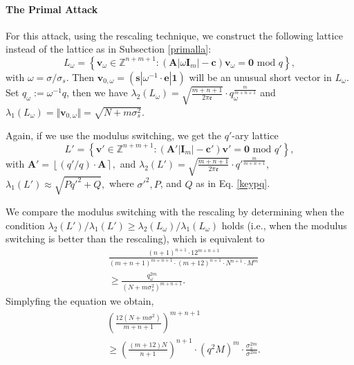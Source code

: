 \documentclass{cta-author}
\begin{document}
\paragraph{The Primal Attack} \label{primalre}
For this attack, using the rescaling technique, we construct the following lattice instead of the lattice as in Subsection \ref{primalla}:
\begin{equation*}\label{primallan}
L_{\omega}=\left\{ \mathbf{v}_{\omega} \in \mathbb{Z}^{n+m+1}:(\mathbf{A}| \omega\mathbf{I}_m|-\mathbf{c})\mathbf{v}_{\omega}=\mathbf{0} \text{ mod } q \right\},
\end{equation*}
with $\omega=\sigma/\sigma_s$. Then $\mathbf{v}_{0, {\omega}}=(\mathbf{s}| \omega^{-1}\cdot \mathbf{e}|\mathbf{1})$ will be an unusual short vector in $L_{\omega}$. Set $q_{\omega}:=\omega^{-1}q$, then we have $\lambda_2(L_{\omega})=\sqrt{\frac{m+n+1}{2 \pi \mathfrak{e}}}\cdot q_{\omega}^{\frac{m}{m+n+1}}$ and $\lambda_1(L_{\omega})=\Vert \mathbf{v}_{0, {\omega}} \Vert=\sqrt{N+m\sigma_s^2}$.


Again, if we use the modulus switching, we get the $q'$-ary lattice
$$L'=\left\{ \mathbf{v'} \in \mathbb{Z}^{n+m+1}:(\mathbf{A'}| \mathbf{I}_m|-\mathbf{c'})\mathbf{v'}=\mathbf{0} \text{ mod } q' \right\},$$
with $\mathbf{A}'=\left\lfloor ({q'}/{q}) \cdot \mathbf{A} \right\rceil,$
and $\lambda_2(L')=\sqrt{\frac{m+n+1}{2 \pi \mathfrak{e}}}\cdot {q'}^{\frac{m}{m+n+1}}$, $
\lambda_1(L')\approx \sqrt{Pq'^2+Q}, $
where $\sigma'^2, P$, and $Q$ as in Eq. \eqref{keypq}.

We compare the modulus switching with the rescaling by determining when the condition $ \lambda_2(L')/\lambda_1(L') \geq \lambda_2(L_{\omega})/\lambda_1(L_{\omega})$ holds (i.e., when the modulus switching is better than the rescaling), which is equivalent to
\begin{equation*}
\begin{split}
&\frac{(n+1)^{n+1} \cdot 12^{m+n+1}}{(m+n+1)^{m+n+1} \cdot (m+12)^{n+1}\cdot N^{n+1}\cdot M^m} \\
&\geq \frac{q_{\omega}^{2m}}{(N+m\sigma_s^2)^{m+n+1}}.
\end{split}
\end{equation*}
Simplyfing the equation we obtain,
	\begin{equation*}\label{keymnn}
\begin{split}
&\left(\frac{12(N+m\sigma^2)}{m+n+1}\right)^{m+n+1}\\
& \geq \left( \frac{(m+12)N}{n+1}\right)^{n+1} \cdot \left( q^{2} M \right)^{m} \cdot \frac{\sigma_s^{2m}}{\sigma^{2m}} .
\end{split}
\end{equation*}
\end{document}
